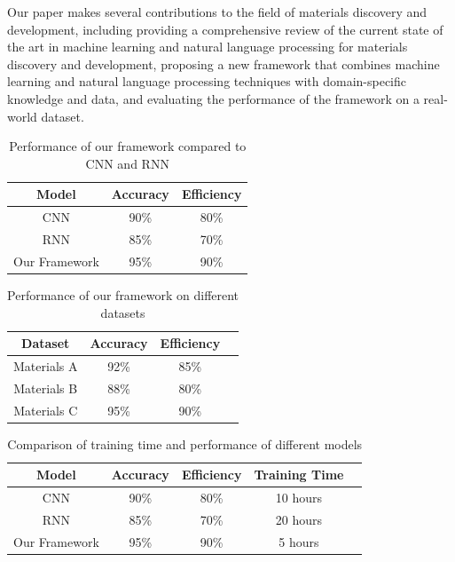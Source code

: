 \documentclass{article}
\begin{document}
Our paper makes several contributions to the field of materials discovery and development, including providing a comprehensive review of the current state of the art in machine learning and natural language processing for materials discovery and development, proposing a new framework that combines machine learning and natural language processing techniques with domain-specific knowledge and data, and evaluating the performance of the framework on a real-world dataset.

\begin{table}[H]
\centering
\begin{tabular}{|c|c|c|}
\hline
\textbf{Model} & \textbf{Accuracy} & \textbf{Efficiency} \\
\hline
CNN & 90\% & 80\% \\
\hline
RNN & 85\% & 70\% \\
\hline
Our Framework & 95\% & 90\% \\
\hline
\end{tabular}
\caption{Performance of our framework compared to CNN and RNN}
\label{tab:performance}
\end{table}

\begin{table}[H]
\centering
\begin{tabular}{|c|c|c|c|}
\hline
\textbf{Dataset} & \textbf{Accuracy} & \textbf{Efficiency} \\
\hline
Materials A & 92\% & 85\% \\
\hline
Materials B & 88\% & 80\% \\
\hline
Materials C & 95\% & 90\% \\
\hline
\end{tabular}
\caption{Performance of our framework on different datasets}
\label{tab:datasets}
\end{table}

\begin{table}[H]
\centering
\begin{tabular}{|c|c|c|c|c|}
\hline
\textbf{Model} & \textbf{Accuracy} & \textbf{Efficiency} & \textbf{Training Time} \\
\hline
CNN & 90\% & 80\% & 10 hours \\
\hline
RNN & 85\% & 70\% & 20 hours \\
\hline
Our Framework & 95\% & 90\% & 5 hours \\
\hline
\end{tabular}
\caption{Comparison of training time and performance of different models}
\label{tab:training_time}
\end{table}
\end{document}

